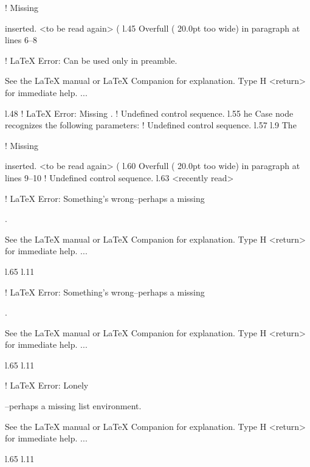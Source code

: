 {{{{{{{{{{{{{{! Missing { inserted.
<to be read again> 
                   (
l.45 Overfull \hbox (
                     20.0pt too wide) in paragraph at lines 6--8

! LaTeX Error: Can be used only in preamble.

See the LaTeX manual or LaTeX Companion for explanation.
Type  H <return>  for immediate help.
 ...                                              
                                                  
l.48 ! LaTeX Error: Missing 
                                            .
! Undefined control sequence.
l.55        he \xmlNode
                       {Case} node recognizes the following parameters:
! Undefined control sequence.
l.57 l.9   The \xmlNode
                       
! Missing { inserted.
<to be read again> 
                   (
l.60 Overfull \hbox (
                     20.0pt too wide) in paragraph at lines 9--10
! Undefined control sequence.
l.63 <recently read> \xmlAttr
                             

! LaTeX Error: Something's wrong--perhaps a missing \item.

See the LaTeX manual or LaTeX Companion for explanation.
Type  H <return>  for immediate help.
 ...                                              
                                                  
l.65 l.11       \item \xmlAttr
                              

! LaTeX Error: Something's wrong--perhaps a missing \item.

See the LaTeX manual or LaTeX Companion for explanation.
Type  H <return>  for immediate help.
 ...                                              
                                                  
l.65 l.11       \item \xmlAttr
                              

! LaTeX Error: Lonely \item--perhaps a missing list environment.

See the LaTeX manual or LaTeX Companion for explanation.
Type  H <return>  for immediate help.
 ...                                              
                                                  
l.65 l.11       \item \xmlAttr
                              
}}}}}}}}}}}}}}}}
